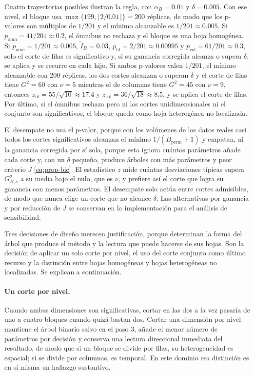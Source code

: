 Cuatro trayectorias posibles ilustran la regla, con $\alpha_B = 0.01$ y
$\delta = 0.005$. Con ese nivel, el bloque usa
$\max\{199,\lceil 2/0.01\rceil\} = 200$ réplicas, de modo que los p-valores son
múltiplos de $1/201$ y el mínimo alcanzable es $1/201\approx 0.005$. Si
$p_{\mathrm{omn}} = 41/201\approx 0.2$, el ómnibus no rechaza y el bloque es
una hoja homogénea. Si $p_{\mathrm{omn}} = 1/201\approx 0.005$,
$\tilde I_B = 0.03$, $p_{\mathrm{fil}} = 2/201\approx 0.00995$ y
$p_{\mathrm{col}} = 61/201\approx 0.3$, solo el corte de filas es significativo
y, si su ganancia corregida alcanza o supera $\delta$, se aplica y se recurre en
cada hijo. Si ambos p-valores valen $1/201$, el mínimo alcanzable con 200
réplicas, los dos cortes alcanzan o superan $\delta$ y el corte de filas tiene $G^2 = 60$ con
$\nu=5$ mientras el de columnas tiene $G^2=45$ con $\nu=9$, entonces
$z_{\mathrm{fil}} = 55/\sqrt{10}\approx 17.4$ y
$z_{\mathrm{col}} = 36/\sqrt{18}\approx 8.5$, y se aplica el corte de filas. Por
último, si el ómnibus rechaza pero ni los cortes unidimensionales ni el conjunto
son significativos, el bloque queda como hoja heterogénea no localizada.

El desempate no usa el p-valor, porque con los volúmenes de los datos reales casi
todos los cortes significativos alcanzan el mínimo $1/(B_{\mathrm{perm}}+1)$ y
empatan, ni la ganancia corregida por sí sola, porque esta ignora cuántos
parámetros añade cada corte y, con un $\delta$ pequeño, produce árboles con más
parámetros y peor criterio $J$ \eqref{eq:prop-bic}. El estadístico $z$ mide
cuántas desviaciones típicas supera $G^2_{B,s}$ a su media bajo el nulo, que es
$\nu$, y prefiere así el corte que logra su ganancia con menos parámetros. El
desempate solo actúa entre cortes admisibles, de modo que nunca elige un corte que
no alcance $\delta$. Las alternativas por ganancia y por reducción de $J$ se
conservan en la implementación para el análisis de sensibilidad.

Tres decisiones de diseño merecen justificación, porque determinan la forma del
árbol que produce el método y la lectura que puede hacerse de sus hojas. Son la
decisión de aplicar un solo corte por nivel, el uso del corte conjunto como
último recurso y la distinción entre hojas homogéneas y hojas heterogéneas no
localizadas. Se explican a continuación.

\paragraph{Un corte por nivel.} Cuando ambas dimensiones son significativas,
cortar en las dos a la vez pasaría de uno a cuatro bloques cuando quizá bastan
dos. Cortar una dimensión por nivel mantiene el árbol binario salvo en el paso
3, añade el menor número de parámetros por decisión y conserva una lectura
direccional inmediata del resultado, de modo que si un bloque se divide por filas, su
heterogeneidad es espacial; si se divide por columnas, es temporal. En este
dominio esa distinción es en sí misma un hallazgo sustantivo.

